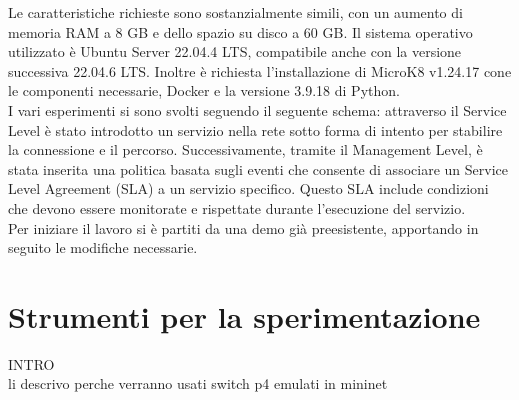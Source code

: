 Le caratteristiche richieste sono sostanzialmente simili, con un aumento di memoria RAM a 8 GB e dello spazio su disco a 60 GB.
Il sistema operativo utilizzato è Ubuntu Server 22.04.4 LTS, compatibile anche con la versione successiva 22.04.6 LTS. 
Inoltre è richiesta l'installazione di MicroK8 v1.24.17 cone le componenti necessarie, Docker e la versione 3.9.18 di Python.
\\I vari esperimenti si sono svolti seguendo il seguente schema:
attraverso il Service Level è stato introdotto un servizio nella rete sotto forma di intento per stabilire la connessione e il percorso. 
Successivamente, tramite il Management Level, è stata inserita una politica basata sugli eventi che consente di associare un Service Level Agreement (SLA) a un servizio specifico.
Questo SLA include condizioni che devono essere monitorate e rispettate durante l'esecuzione del servizio.
\\Per iniziare il lavoro si è partiti da una demo già preesistente, apportando in seguito le modifiche necessarie.
\section{Strumenti per la sperimentazione}
INTRO
\\li descrivo perche verranno usati switch p4 emulati in mininet
